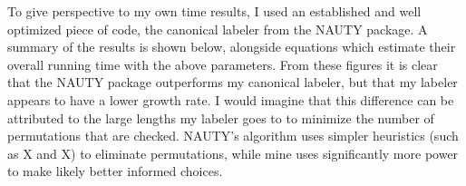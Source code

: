 To give perspective to my own time results, I used an established and well optimized piece of code, the canonical labeler from the NAUTY package.
A summary of the results is shown below, alongside equations which estimate their overall running time with the above parameters.
From these figures it is clear that the NAUTY package outperforms my canonical labeler, but that my labeler appears to have a lower growth rate.
I would imagine that this difference can be attributed to the large lengths my labeler goes to to minimize the number of permutations that are checked.
NAUTY's algorithm uses simpler heuristics (such as X and X) to eliminate permutations, while mine uses significantly more power to make likely better informed choices.
